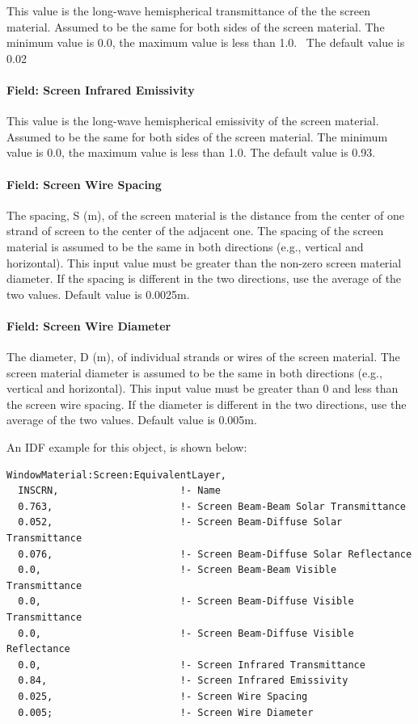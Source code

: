 This value is the long-wave hemispherical transmittance of the the screen material. Assumed to be the same for both sides of the screen material. The minimum value is 0.0, the maximum value is less than 1.0.~ The default value is 0.02

\paragraph{Field: Screen Infrared Emissivity}\label{field-screen-infrared-emissivity}

This value is the long-wave hemispherical emissivity of the screen material. Assumed to be the same for both sides of the screen material. The minimum value is 0.0, the maximum value is less than 1.0. The default value is 0.93.

\paragraph{Field: Screen Wire Spacing}\label{field-screen-wire-spacing}

The spacing, S (m), of the screen material is the distance from the center of one strand of screen to the center of the adjacent one. The spacing of the screen material is assumed to be the same in both directions (e.g., vertical and horizontal). This input value must be greater than the non-zero screen material diameter. If the spacing is different in the two directions, use the average of the two values. Default value is 0.0025m.

\paragraph{Field: Screen Wire Diameter}\label{field-screen-wire-diameter}

The diameter, D (m), of individual strands or wires of the screen material. The screen material diameter is assumed to be the same in both directions (e.g., vertical and horizontal). This input value must be greater than 0 and less than the screen wire spacing. If the diameter is different in the two directions, use the average of the two values. Default value is 0.005m.

An IDF example for this object, is shown below:

\begin{lstlisting}
WindowMaterial:Screen:EquivalentLayer,
  INSCRN,                     !- Name
  0.763,                      !- Screen Beam-Beam Solar Transmittance
  0.052,                      !- Screen Beam-Diffuse Solar Transmittance
  0.076,                      !- Screen Beam-Diffuse Solar Reflectance
  0.0,                        !- Screen Beam-Beam Visible Transmittance
  0.0,                        !- Screen Beam-Diffuse Visible Transmittance
  0.0,                        !- Screen Beam-Diffuse Visible Reflectance
  0.0,                        !- Screen Infrared Transmittance
  0.84,                       !- Screen Infrared Emissivity
  0.025,                      !- Screen Wire Spacing
  0.005;                      !- Screen Wire Diameter
\end{lstlisting}

